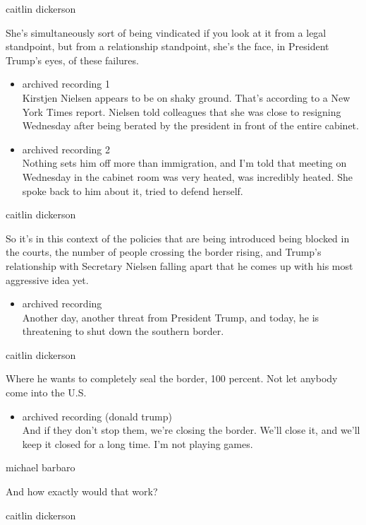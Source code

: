 caitlin dickerson

She's simultaneously sort of being vindicated if you look at it from a
legal standpoint, but from a relationship standpoint, she's the face, in
President Trump's eyes, of these failures.

\begin{itemize}
\item
  archived recording 1\\
  Kirstjen Nielsen appears to be on shaky ground. That's according to a
  New York Times report. Nielsen told colleagues that she was close to
  resigning Wednesday after being berated by the president in front of
  the entire cabinet.
\item
  archived recording 2\\
  Nothing sets him off more than immigration, and I'm told that meeting
  on Wednesday in the cabinet room was very heated, was incredibly
  heated. She spoke back to him about it, tried to defend herself.
\end{itemize}

caitlin dickerson

So it's in this context of the policies that are being introduced being
blocked in the courts, the number of people crossing the border rising,
and Trump's relationship with Secretary Nielsen falling apart that he
comes up with his most aggressive idea yet.

\begin{itemize}
\tightlist
\item
  archived recording\\
  Another day, another threat from President Trump, and today, he is
  threatening to shut down the southern border.
\end{itemize}

caitlin dickerson

Where he wants to completely seal the border, 100 percent. Not let
anybody come into the U.S.

\begin{itemize}
\tightlist
\item
  archived recording (donald trump)\\
  And if they don't stop them, we're closing the border. We'll close it,
  and we'll keep it closed for a long time. I'm not playing games.
\end{itemize}

michael barbaro

And how exactly would that work?

caitlin dickerson

